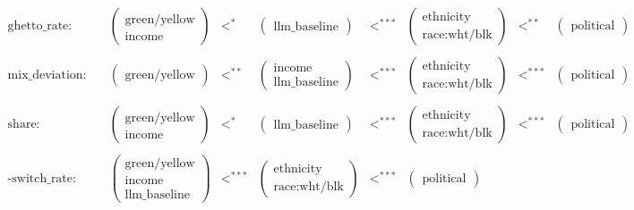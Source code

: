 \begin{table}[htbp]
\begin{align*}
\text{ghetto\_rate:} & \quad \begin{pmatrix} \text{green/yellow} \\ \text{income} \end{pmatrix} & <^{*} & \begin{pmatrix} \text{llm\_baseline} \end{pmatrix} & <^{***} & \begin{pmatrix} \text{ethnicity} \\ \text{race:wht/blk} \end{pmatrix} & <^{**} & \begin{pmatrix} \text{political} \end{pmatrix} \\\\[1em]
\text{mix\_deviation:} & \quad \begin{pmatrix} \text{green/yellow} \end{pmatrix} & <^{**} & \begin{pmatrix} \text{income} \\ \text{llm\_baseline} \end{pmatrix} & <^{***} & \begin{pmatrix} \text{ethnicity} \\ \text{race:wht/blk} \end{pmatrix} & <^{***} & \begin{pmatrix} \text{political} \end{pmatrix} \\\\[1em]
\text{share:} & \quad \begin{pmatrix} \text{green/yellow} \\ \text{income} \end{pmatrix} & <^{*} & \begin{pmatrix} \text{llm\_baseline} \end{pmatrix} & <^{***} & \begin{pmatrix} \text{ethnicity} \\ \text{race:wht/blk} \end{pmatrix} & <^{***} & \begin{pmatrix} \text{political} \end{pmatrix} \\\\[1em]
\text{-switch\_rate:} & \quad \begin{pmatrix} \text{green/yellow} \\ \text{income} \\ \text{llm\_baseline} \end{pmatrix} & <^{***} & \begin{pmatrix} \text{ethnicity} \\ \text{race:wht/blk} \end{pmatrix} & <^{***} & \begin{pmatrix} \text{political} \end{pmatrix}
\end{align*}
\vspace{2em}


\end{table}
